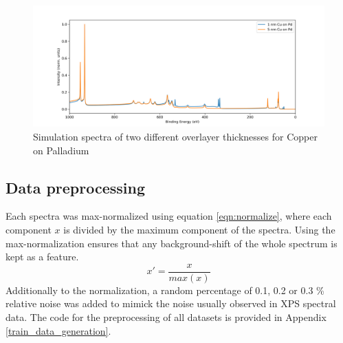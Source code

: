 \begin{figure}
    \centering
    \includegraphics[width=\textwidth]{Figures/depth.png}
    \caption{Simulation spectra of two different overlayer thicknesses for Copper on Palladium}
    \label{fig:depths}
\end{figure}



\subsection{Data preprocessing}

Each spectra was max-normalized using equation \ref{eqn:normalize}, where each component $x$ is divided by the maximum component of the spectra. Using the max-normalization ensures that any background-shift of the whole spectrum is kept as a feature.
\begin{equation}
    x' = \frac{x}{max(x)}
\label{eqn:normalize}
\end{equation}
Additionally to the normalization, a random percentage of 0.1, 0.2 or 0.3 \% relative noise was added to mimick the noise usually observed in XPS spectral data. The code for the preprocessing of all datasets is provided in Appendix \ref{train_data_generation}.